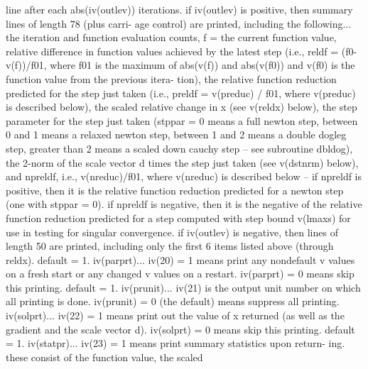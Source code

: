\documentclass[11pt,twoside,nolof]{starlink}
\begin{document}
\begin{terminalv}
              line after each abs(iv(outlev)) iterations.  if iv(outlev)
              is positive, then summary lines of length 78 (plus carri-
              age control) are printed, including the following...  the
              iteration and function evaluation counts, f = the current
              function value, relative difference in function values
              achieved by the latest step (i.e., reldf = (f0-v(f))/f01,
              where f01 is the maximum of abs(v(f)) and abs(v(f0)) and
              v(f0) is the function value from the previous itera-
              tion), the relative function reduction predicted for the
              step just taken (i.e., preldf = v(preduc) / f01, where
              v(preduc) is described below), the scaled relative change
              in x (see v(reldx) below), the step parameter for the
              step just taken (stppar = 0 means a full newton step,
              between 0 and 1 means a relaxed newton step, between 1
              and 2 means a double dogleg step, greater than 2 means
              a scaled down cauchy step -- see subroutine dbldog), the
              2-norm of the scale vector d times the step just taken
              (see v(dstnrm) below), and npreldf, i.e.,
              v(nreduc)/f01, where v(nreduc) is described below -- if
              npreldf is positive, then it is the relative function
              reduction predicted for a newton step (one with
              stppar = 0).  if npreldf is negative, then it is the
              negative of the relative function reduction predicted
              for a step computed with step bound v(lmaxs) for use in
              testing for singular convergence.
                   if iv(outlev) is negative, then lines of length 50
              are printed, including only the first 6 items listed
              above (through reldx).
              default = 1.
  iv(parprt)... iv(20) = 1 means print any nondefault v values on a
              fresh start or any changed v values on a restart.
              iv(parprt) = 0 means skip this printing.  default = 1.
  iv(prunit)... iv(21) is the output unit number on which all printing
              is done.  iv(prunit) = 0 (the default) means suppress all
              printing.
  iv(solprt)... iv(22) = 1 means print out the value of x returned (as
              well as the gradient and the scale vector d).
              iv(solprt) = 0 means skip this printing.  default = 1.
  iv(statpr)... iv(23) = 1 means print summary statistics upon return-
              ing.  these consist of the function value, the scaled

\end{terminalv}
\end{document}
